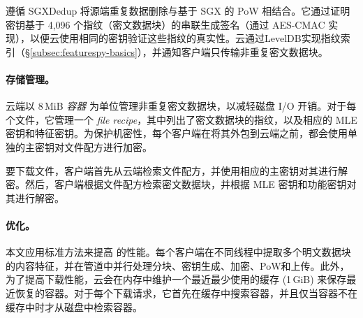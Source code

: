 \prototype 遵循 SGXDedup 将源端重复数据删除与基于 SGX 的 PoW 相结合。它通过证明密钥基于 4,096 个指纹（密文数据块）的串联生成签名（通过 AES-CMAC 实现），以便云使用相同的密钥验证这些指纹的真实性。云通过LevelDB\cite{leveldb}实现指纹索引（\S\ref{subsec:featurespy-basics}），并通知客户端只传输非重复密文数据块。

\paragraph*{存储管理。}
云端以 8\,MiB {\em 容器} 为单位管理非重复密文数据块，以减轻磁盘 I/O 开销。对于每个文件，它管理一个 {\em file recipe}，其中列出了密文数据块的指纹，以及相应的 MLE 密钥和特征密钥。为保护机密性，每个客户端在将其外包到云端之前，都会使用单独的主密钥对文件配方进行加密。

要下载文件，客户端首先从云端检索文件配方，并使用相应的主密钥对其进行解密。然后，客户端根据文件配方检索密文数据块，并根据 MLE 密钥和功能密钥对其进行解密。

\paragraph*{优化。}
本文应用标准方法来提高 \prototype 的性能。每个客户端在不同线程中提取多个明文数据块的内容特征，并在管道中并行处理分块、密钥生成、加密、PoW和上传。此外，为了提高下载性能，云会在内存中维护一个最近最少使用的缓存 (1\,GiB) 来保存最近恢复的容器。对于每个下载请求，它首先在缓存中搜索容器，并且仅当容器不在缓存中时才从磁盘中检索容器。